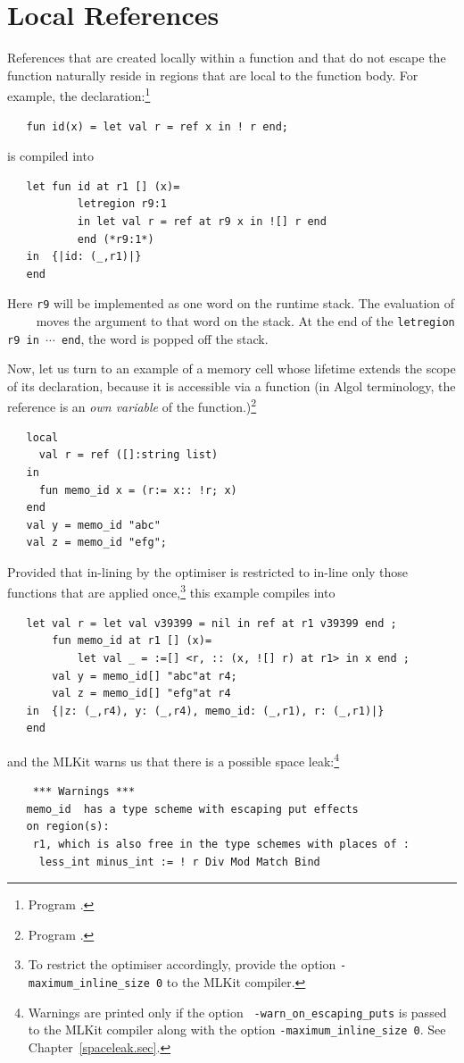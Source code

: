 \documentclass[12pt]{book}
\begin{document}
\section{Local References}
References  that are created locally within a
function and that do not escape the function naturally reside in
regions that are local to the function body.  For example, the
declaration:\footnote{Program .}
\begin{verbatim}
   fun id(x) = let val r = ref x in ! r end;
\end{verbatim}
is compiled into
\begin{verbatim}
   let fun id at r1 [] (x)= 
           letregion r9:1 
           in let val r = ref at r9 x in ![] r end  
           end (*r9:1*)
   in  {|id: (_,r1)|}
   end 
\end{verbatim}
Here {\tt r9} will be implemented as one word on the runtime stack.
The evaluation of ~~~~ moves the argument 
to that word on the stack. At the end of the {\tt letregion r9 in
  $\cdots$ end}, the word is popped off the stack.

Now, let us turn to an example of a memory cell whose lifetime extends
the scope of its declaration, because it is accessible via a function
(in Algol terminology, the reference is an {\em own variable}
%
of the function.)\footnote{Program .}
\begin{verbatim}
   local
     val r = ref ([]:string list)
   in
     fun memo_id x = (r:= x:: !r; x)
   end
   val y = memo_id "abc"
   val z = memo_id "efg";
\end{verbatim}
Provided that in-lining by the optimiser is restricted to in-line only
those functions that are applied once,\footnote{To restrict the
  optimiser accordingly, provide the option
  \texttt{-maximum\_inline\_size 0} to the MLKit compiler.} this example
compiles into
\begin{verbatim}
   let val r = let val v39399 = nil in ref at r1 v39399 end ; 
       fun memo_id at r1 [] (x)= 
           let val _ = :=[] <r, :: (x, ![] r) at r1> in x end ; 
       val y = memo_id[] "abc"at r4; 
       val z = memo_id[] "efg"at r4
   in  {|z: (_,r4), y: (_,r4), memo_id: (_,r1), r: (_,r1)|}
   end 
\end{verbatim}
and the MLKit warns us that there is a possible space
leak:\footnote{Warnings are printed only if the option {\tt
    -warn\_on\_escaping\_puts} is passed to the MLKit compiler along
  with the option \texttt{-maximum\_inline\_size 0}. See
  Chapter~\ref{spaceleak.sec}.}
\begin{verbatim}
    *** Warnings ***
   memo_id  has a type scheme with escaping put effects 
   on region(s): 
    r1, which is also free in the type schemes with places of :  
     less_int minus_int := ! r Div Mod Match Bind
\end{verbatim}
\end{document}
